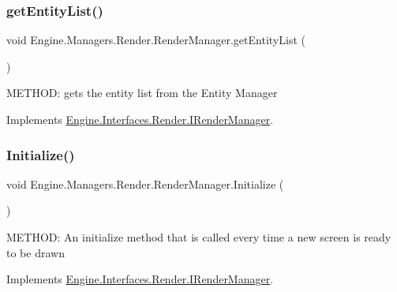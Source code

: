 \mbox{\label{a00526_aeb436300e604d81ff837227e5dd11710}} 
\subsubsection{\texorpdfstring{get\+Entity\+List()}{getEntityList()}}
{\footnotesize\ttfamily void Engine.\+Managers.\+Render.\+Render\+Manager.\+get\+Entity\+List (\begin{DoxyParamCaption}{ }\end{DoxyParamCaption})\hspace{0.3cm}{\ttfamily [inline]}}



M\+E\+T\+H\+OD\+: gets the entity list from the Entity Manager 



Implements \hyperlink{a00458_a48c8e64f7e597fdea8412057d24bcb3d}{Engine.\+Interfaces.\+Render.\+I\+Render\+Manager}.

\mbox{\label{a00526_abd794ae4c12392323e9afda73e459bef}} 
\subsubsection{\texorpdfstring{Initialize()}{Initialize()}}
{\footnotesize\ttfamily void Engine.\+Managers.\+Render.\+Render\+Manager.\+Initialize (\begin{DoxyParamCaption}{ }\end{DoxyParamCaption})\hspace{0.3cm}{\ttfamily [inline]}}



M\+E\+T\+H\+OD\+: An initialize method that is called every time a new screen is ready to be drawn 



Implements \hyperlink{a00458_ab1282efae383e9024233a2fc1eb7577b}{Engine.\+Interfaces.\+Render.\+I\+Render\+Manager}.

